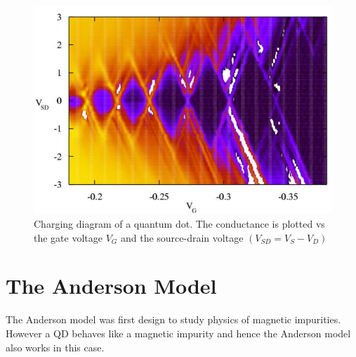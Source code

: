 \begin{figure}[tb]
    \centering
    \includegraphics[scale=0.3]{IMAGES/Preliminars/QD-Blockade.png}
    \caption{ Charging diagram of a quantum dot. The conductance is plotted vs the gate voltage $V_G$ and the source-drain voltage $(V_{SD}=V_{S}-V_{D} )$ \protect{} }
    \label{fig:QD-Blockade}
\end{figure}










\section{The Anderson Model}
The Anderson model \citep{anderson_localized_1961} was first design to study physics of magnetic impurities. However a QD behaves like  a magnetic impurity and hence the Anderson model also works in this case. 

